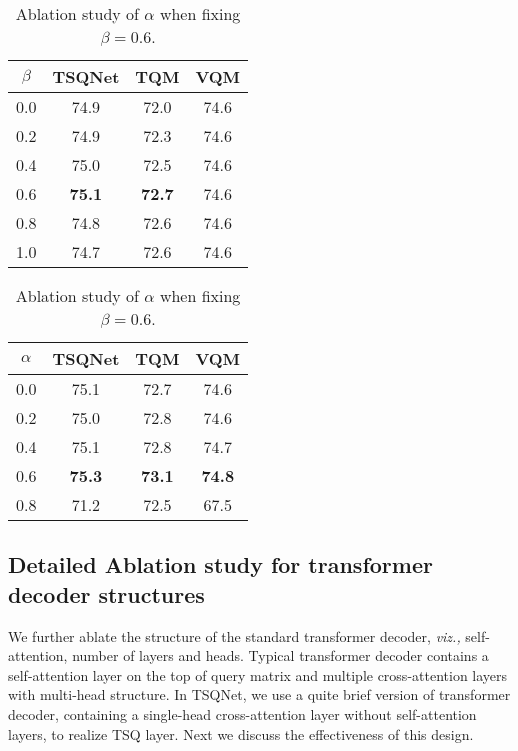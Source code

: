 \documentclass[runningheads]{llncs}
\begin{document}
\begin{table}
\begin{minipage}[t]{0.47\linewidth}
\begin{center}
\caption{Ablation study of $\beta$ when fixing $\alpha=0$.}
\label{table:alpha}
\setlength{\tabcolsep}{3.0pt}
\begin{tabular}{cccc}
\toprule
$\beta$ & TSQNet& TQM  & VQM\\
\midrule
0.0 &  74.9 & 72.0 &74.6 \\
0.2 &  74.9 & 72.3 & 74.6\\
0.4 &  75.0 & 72.5 & 74.6\\
0.6 &  \textbf{75.1} & \textbf{72.7} & 74.6\\
0.8 &  74.8    & 72.6 & 74.6 \\
1.0 &  74.7   & 72.6 & 74.6 \\
\bottomrule
\end{tabular}
\end{center}
\end{minipage}
\hfill
\begin{minipage}[t]{0.47\linewidth}
\begin{center}
\caption{Ablation study of $\alpha$ when fixing $\beta=0.6$.}\label{table3:beta}
\setlength{\tabcolsep}{3.0pt}
\renewcommand{\arraystretch}{1.18}
\begin{tabular}{cccc}
\toprule
$\alpha$ & TSQNet & TQM & VQM \\
\midrule
0.0 &  75.1 & 72.7 & 74.6 \\
0.2 &  75.0 & 72.8 & 74.6 \\
0.4 &  75.1  & 72.8 & 74.7\\
0.6 &  \textbf{75.3}  & \textbf{73.1} & \textbf{74.8}\\
0.8 &  71.2  & 72.5 & 67.5\\
\bottomrule
\end{tabular}
\end{center}
\end{minipage}
\end{table} 
\subsection{Detailed Ablation study for transformer decoder structures}
We further ablate the structure of the standard transformer decoder, \emph{viz.,} self-attention, number of layers and heads.  Typical transformer decoder contains a self-attention layer on the top of query matrix and multiple cross-attention layers with multi-head structure. In TSQNet, we use a quite brief version of transformer decoder, containing a single-head cross-attention layer without self-attention layers, to realize TSQ layer. Next we discuss the effectiveness of this design.  
\end{document}
